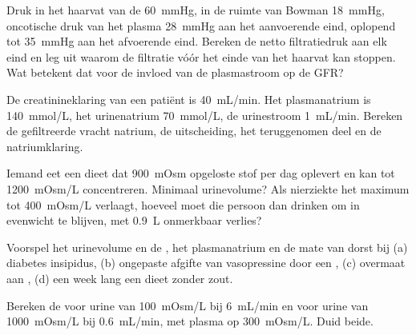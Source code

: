 \begin{exercise}[$\star\star$]\label{exo:b3:renal-osmoregulation:5}
Druk in het haarvat van de  \qty{60}{mmHg}, in de ruimte van
Bowman \qty{18}{mmHg}, oncotische druk van het plasma \qty{28}{mmHg}
aan het aanvoerende eind, oplopend tot \qty{35}{mmHg} aan het
afvoerende eind. Bereken de netto filtratiedruk aan elk eind en leg uit
waarom de filtratie vóór het einde van het haarvat kan stoppen. Wat
betekent dat voor de invloed van de plasmastroom op de GFR?
\end{exercise}

\begin{exercise}[$\star\star$]\label{exo:b3:renal-osmoregulation:6}
De creatinineklaring van een patiënt is \qty{40}{mL/min}. Het
plasmanatrium is \qty{140}{mmol/L}, het urinenatrium \qty{70}{mmol/L},
de urinestroom \qty{1}{mL/min}. Bereken de gefiltreerde vracht natrium,
de uitscheiding, het teruggenomen deel en de natriumklaring.
\end{exercise}

\begin{exercise}[$\star\star$]\label{exo:b3:renal-osmoregulation:7}
Iemand eet een dieet dat \qty{900}{mOsm} opgeloste stof per dag
oplevert en kan tot \qty{1200}{mOsm/L} concentreren. Minimaal
urinevolume? Als nierziekte het maximum tot \qty{400}{mOsm/L} verlaagt,
hoeveel moet die persoon dan drinken om in evenwicht te blijven, met
\qty{0.9}{L} onmerkbaar verlies?
\end{exercise}

\begin{exercise}[$\star\star$]\label{exo:b3:renal-osmoregulation:8}
Voorspel het urinevolume en de , het plasmanatrium en de
mate van dorst bij (a) diabetes insipidus, (b) ongepaste afgifte van
vasopressine door een , (c) overmaat aan , (d) een week
lang een dieet zonder zout.
\end{exercise}

\begin{exercise}[$\star\star$]\label{exo:b3:renal-osmoregulation:9}
Bereken de  voor urine van \qty{100}{mOsm/L} bij
\qty{6}{mL/min} en voor urine van \qty{1000}{mOsm/L} bij
\qty{0.6}{mL/min}, met plasma op \qty{300}{mOsm/L}. Duid beide.
\end{exercise}

